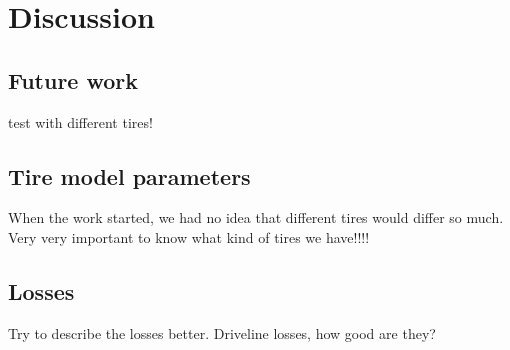 \chapter{Discussion}

\section{Future work}

test with different tires!

\section{Tire model parameters}
When the work started, we had no idea that different tires would differ so much. Very very important to know what kind of tires we have!!!!

\section{Losses}
Try to describe the losses better. Driveline losses, how good are they?